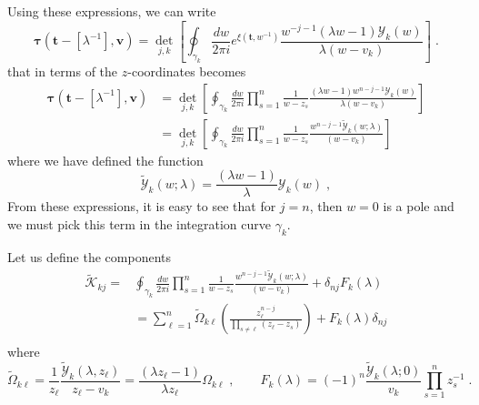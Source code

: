 \documentclass[a4paper,11pt]{amsart}
\begin{document}
Using these expressions, we can write 
\begin{equation}
  \bm{\tau}(\bm{t} - [\lambda^{-1}], \bm{v}) =
  \det_{j,k}\left[
  \oint_{\gamma_k} \frac{dw}{2\pi i} e^{\xi(\bm{t}, w^{-1})} \frac{w^{- j -1} ( \lambda w - 1) \mathcal{Y}_k(w)}{\lambda(w - v_k)} 
  \right]\; .
\end{equation}
that in terms of the \(z\)-coordinates becomes
\begin{equation}
\begin{split}
  \bm{\tau}(\bm{t} - [\lambda^{-1}], \bm{v})
  & = \det_{j,k}\left[\oint_{\gamma_k} \frac{dw}{2\pi i} \prod_{s=1}^n \frac{1}{w - z_s}  
    \frac{( \lambda w - 1) w^{n-j-1}\mathcal{Y}_k(w)}{\lambda(w - v_k)} \right]\\
  & = \det_{j,k}\left[
    \oint_{\gamma_k} \frac{dw}{2\pi i} \prod_{s=1}^n \frac{1}{w - z_s}  
    \frac{w^{n-j-1}\widetilde{\mathcal{Y}}_k(w; \lambda)}{(w - v_k)}
    \right]
\end{split}
\end{equation}
where we have defined the function 
\begin{equation}
  \widetilde{\mathcal{Y}}_k(w; \lambda)
  = \frac{( \lambda w - 1)}{\lambda} \mathcal{Y}_k(w) \; ,
\end{equation}
From these expressions, it is easy to see that for \(j=n\), then \(w =
0\) is a pole and we must pick this term in the integration curve
\(\gamma_k\).

Let us define the components
\begin{equation}
  \begin{split}
    \widetilde{\mathcal{K}}_{kj} = &
    \oint_{\gamma_k} \frac{dw}{2\pi i} \prod_{s=1}^n \frac{1}{w - z_s}
    \frac{w^{n-j-1}\widetilde{\mathcal{Y}}_k(w; \lambda)}{(w - v_k)}
    + \delta_{nj} F_k(\lambda) \\
    & = \sum_{\ell = 1}^n  \widetilde{\Omega}_{k \ell} \left( \frac{z_\ell^{n-j}}{\prod_{s\neq \ell} (z_\ell - z_s)} \right)
    + F_k(\lambda)\delta_{nj}  \\
  \end{split}
\end{equation}
where
\begin{equation}
  \widetilde{\Omega}_{k\ell}
  = \frac{1}{z_\ell} \frac{\widetilde{\mathcal{Y}}_k(\lambda, z_\ell)}{z_\ell - v_k}
  = \frac{(\lambda z_\ell -1)}{\lambda z_\ell} {\Omega}_{k\ell} 
\; , \qquad 
 F_k(\lambda) = (-1)^n \frac{\widetilde{\mathcal{Y}}_k(\lambda; 0)}{v_k }  \prod_{s=1}^n z_s^{-1} \; .
\end{equation}
\end{document}
